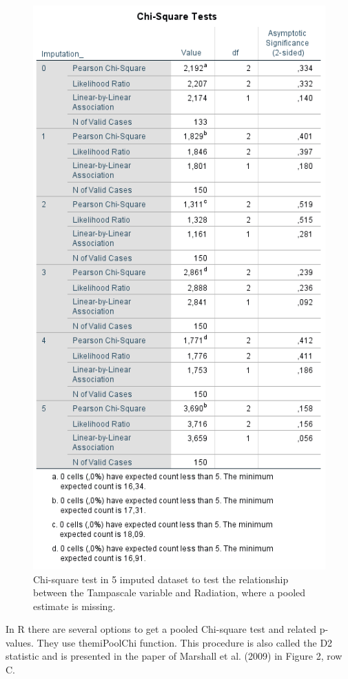\documentclass[]{book}
\theoremstyle{definition}
\theoremstyle{definition}
\theoremstyle{definition}
\theoremstyle{remark}
\begin{document}
\begin{figure}

{\centering \includegraphics[width=0.9\linewidth]{images/table5.6} 

}

\caption{Chi-square test in 5 imputed dataset to test the relationship between the Tampascale variable and Radiation, where a pooled estimate is missing.}\label{fig:tab5-6}
\end{figure}

In R there are several options to get a pooled Chi-square test and
related p-values. They use themiPoolChi function. This procedure is also
called the D2 statistic and is presented in the paper of Marshall et al.
(2009) in Figure 2, row C.
\end{document}
